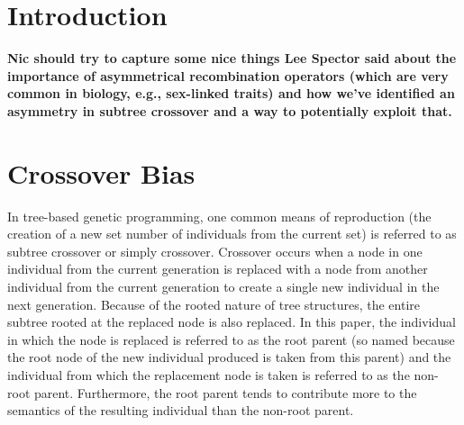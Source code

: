 \documentclass{sig-alternate}
\begin{document}
\category{}{}{}
\terms{}

\section{Introduction} \label{sec:Introduction}

\textbf{Nic should try to capture some nice things Lee Spector said about the importance of asymmetrical 
recombination operators (which are very common in biology, e.g., sex-linked traits) and how we've identified an 
asymmetry in subtree crossover and a way to potentially exploit that.}

\section{Crossover Bias} \label{sec:XObias}

In tree-based genetic programming, one common means of reproduction (the creation of a new set number of individuals
from the current set) is referred to as subtree crossover or simply crossover. Crossover occurs when a node in one
individual from the current generation is replaced with a node from another individual from the current generation to
create a single new individual in the next generation. Because of the rooted nature of tree structures, the entire
subtree rooted at the replaced node is also replaced. In this paper, the individual in which the node is replaced is
referred to as the root parent (so named because the root node of the new individual produced is taken from this
parent) and the individual from which the replacement node is taken is referred to as the non-root parent. Furthermore,
the root parent tends to contribute more to the semantics of the resulting individual than the non-root parent.
\end{document}
